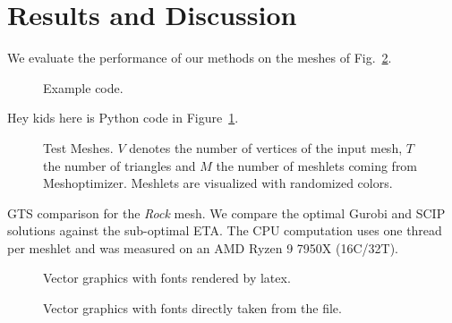 \section{Results and Discussion}\label{Sec:Evaluation}

We evaluate the performance of our methods on the meshes of Fig.~\ref{fig:meshes}.
\begin{figure}
%
\caption{Example code.}\label{Code:Python}%
\end{figure}
    
Hey kids here is Python code in Figure~\ref{Code:Python}.

\begin{figure}
    \centering%
    \def\svgwidth{\textwidth}%
    \fontsize{6pt}{5pt}\selectfont%
    \caption{Test Meshes.
    $V$ denotes the number of vertices of the input mesh, $T$ the number of triangles and $M$ the number of meshlets coming from Meshoptimizer.
    Meshlets are visualized with randomized colors.
    }\label{fig:meshes}%
\end{figure}%

\begin{table}
    \caption{\acs{GTS} comparison for the \textit{Rock} mesh.
    We compare the optimal Gurobi and SCIP solutions against the sub-optimal \acs{ETA}.
    The CPU computation uses one thread per meshlet and was measured on an AMD Ryzen 9 7950X (16C/32T).    
    }\label{tab:StripifyTable}    
    {
    \centering    
    
    }
\end{table}


\begin{figure}
    
    \caption{Vector graphics with fonts rendered by latex.}\label{fig:latexfonts}
\end{figure}

\begin{figure}
    
    \caption{Vector graphics with fonts directly taken from the file.}\label{fig:svgfonts}
\end{figure}

